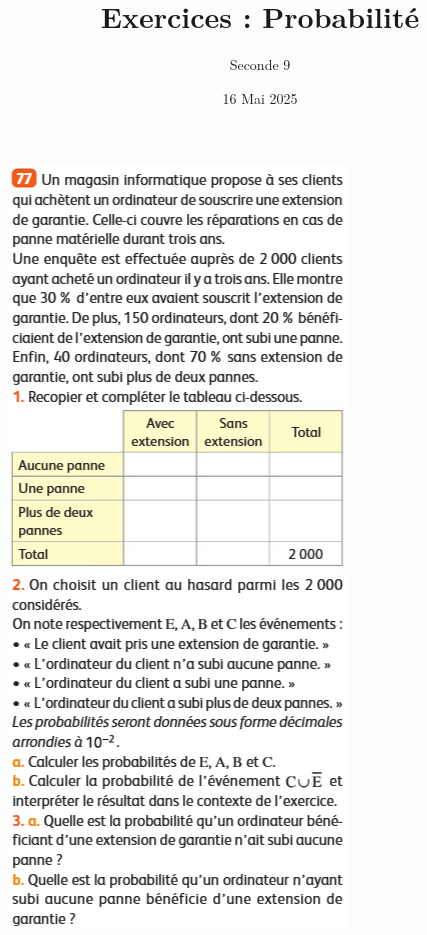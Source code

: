 \documentclass{article}
\title{Exercices : Probabilité}
\date{16 Mai 2025}
\author{Seconde 9}
\begin{document}
\maketitle
\begin{center}
\begin{minipage}{0.40\textwidth}
\includegraphics[width=\textwidth]{Exercice_3.png}

\end{minipage}
\end{center}
\end{document}
